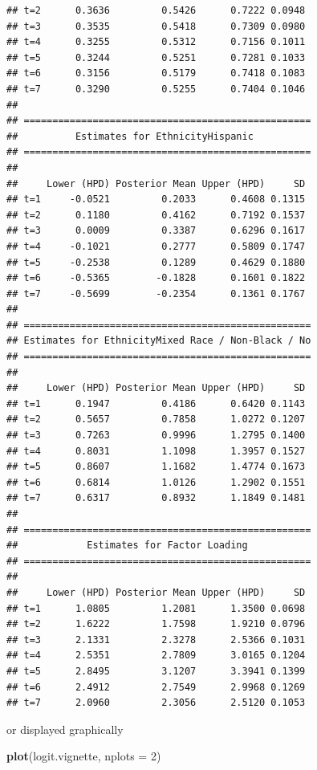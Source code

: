 \documentclass[a4paper, preprint, 3p,
authoryear]{elsarticle} %
\newenvironment{Shaded}{\begin{snugshade}}{\end{snugshade}}
\newcommand{\AttributeTok}[1]{\textcolor[rgb]{0.13,0.29,0.53}{#1}}
\newcommand{\DecValTok}[1]{\textcolor[rgb]{0.00,0.00,0.81}{#1}}
\newcommand{\FunctionTok}[1]{\textcolor[rgb]{0.13,0.29,0.53}{\textbf{#1}}}
\newcommand{\NormalTok}[1]{#1}
\begin{document}
\begin{verbatim}
## t=2      0.3636         0.5426      0.7222 0.0948
## t=3      0.3535         0.5418      0.7309 0.0980
## t=4      0.3255         0.5312      0.7156 0.1011
## t=5      0.3244         0.5251      0.7281 0.1033
## t=6      0.3156         0.5179      0.7418 0.1083
## t=7      0.3290         0.5255      0.7404 0.1046
## 
## ==================================================
##          Estimates for EthnicityHispanic
## ==================================================
## 
##     Lower (HPD) Posterior Mean Upper (HPD)     SD
## t=1     -0.0521         0.2033      0.4608 0.1315
## t=2      0.1180         0.4162      0.7192 0.1537
## t=3      0.0009         0.3387      0.6296 0.1617
## t=4     -0.1021         0.2777      0.5809 0.1747
## t=5     -0.2538         0.1289      0.4629 0.1880
## t=6     -0.5365        -0.1828      0.1601 0.1822
## t=7     -0.5699        -0.2354      0.1361 0.1767
## 
## ==================================================
## Estimates for EthnicityMixed Race / Non-Black / No
## ==================================================
## 
##     Lower (HPD) Posterior Mean Upper (HPD)     SD
## t=1      0.1947         0.4186      0.6420 0.1143
## t=2      0.5657         0.7858      1.0272 0.1207
## t=3      0.7263         0.9996      1.2795 0.1400
## t=4      0.8031         1.1098      1.3957 0.1527
## t=5      0.8607         1.1682      1.4774 0.1673
## t=6      0.6814         1.0126      1.2902 0.1551
## t=7      0.6317         0.8932      1.1849 0.1481
## 
## ==================================================
##            Estimates for Factor Loading
## ==================================================
## 
##     Lower (HPD) Posterior Mean Upper (HPD)     SD
## t=1      1.0805         1.2081      1.3500 0.0698
## t=2      1.6222         1.7598      1.9210 0.0796
## t=3      2.1331         2.3278      2.5366 0.1031
## t=4      2.5351         2.7809      3.0165 0.1204
## t=5      2.8495         3.1207      3.3941 0.1399
## t=6      2.4912         2.7549      2.9968 0.1269
## t=7      2.0960         2.3056      2.5120 0.1053
\end{verbatim}

or displayed graphically

\begin{Shaded}
\begin{Highlighting}[]
\FunctionTok{plot}\NormalTok{(logit.vignette, }\AttributeTok{nplots =} \DecValTok{2}\NormalTok{)}
\end{Highlighting}
\end{Shaded}
\end{document}

